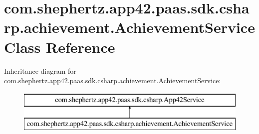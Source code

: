 \hypertarget{classcom_1_1shephertz_1_1app42_1_1paas_1_1sdk_1_1csharp_1_1achievement_1_1_achievement_service}{\section{com.\+shephertz.\+app42.\+paas.\+sdk.\+csharp.\+achievement.\+Achievement\+Service Class Reference}
\label{classcom_1_1shephertz_1_1app42_1_1paas_1_1sdk_1_1csharp_1_1achievement_1_1_achievement_service}
}
Inheritance diagram for com.\+shephertz.\+app42.\+paas.\+sdk.\+csharp.\+achievement.\+Achievement\+Service\+:\begin{figure}[H]
\begin{center}
\leavevmode
\includegraphics[height=2.000000cm]{classcom_1_1shephertz_1_1app42_1_1paas_1_1sdk_1_1csharp_1_1achievement_1_1_achievement_service}
\end{center}
\end{figure}
